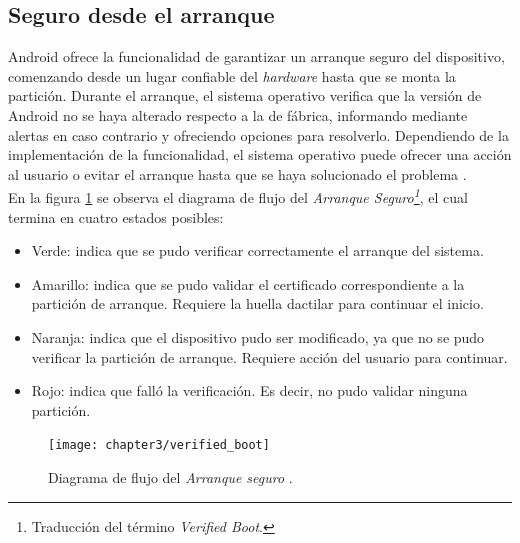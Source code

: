 \subsection{Seguro desde el arranque}
Android ofrece la funcionalidad de garantizar un arranque seguro del dispositivo, comenzando desde un lugar confiable del \textit{hardware} hasta que se monta la partición. Durante el arranque, el sistema operativo verifica que la versión de Android no se haya alterado respecto a la de fábrica, informando mediante alertas en caso contrario y ofreciendo opciones para resolverlo. Dependiendo de la implementación de la funcionalidad, el sistema operativo puede ofrecer una acción al usuario o evitar el arranque hasta que se haya solucionado el problema \cite{aossec}.\\
En la figura \ref{fig:ch03:verifyBoot} se observa el diagrama de flujo del \textit{Arranque Seguro\footnote{Traducción del término \textit{Verified Boot}.}}, el cual termina en cuatro estados posibles:
\begin{itemize}
	\item Verde: indica que se pudo verificar correctamente el arranque del sistema.
	\item Amarillo: indica que se pudo validar el certificado correspondiente a la partición de arranque. Requiere la huella dactilar para continuar el inicio.
	\item Naranja: indica que el dispositivo pudo ser modificado, ya que no se pudo verificar la partición de arranque. Requiere acción del usuario para continuar.
	\item Rojo: indica que falló la verificación. Es decir, no pudo validar ninguna partición.
\end{itemize}
\begin{figure}[hbtp]
	\begin{center}
		\texttt{[image: chapter3/verified\_boot]}
		\caption{Diagrama de flujo del \textit{Arranque seguro} \cite{asreview2015}.}
		\label{fig:ch03:verifyBoot}
	\end{center}
\end{figure}
